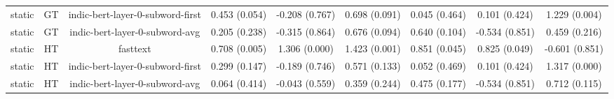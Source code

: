 \begin{sidewaystable}[htb]
\begin{tabular}{@{}ccccccccc@{}}
        static & GT & indic-bert-layer-0-subword-first & 0.453 (0.054) & -0.208 (0.767) & 0.698 (0.091) & 0.045 (0.464) & 0.101 (0.424) & 1.229 (0.004) \\
        static & GT & indic-bert-layer-0-subword-avg & 0.205 (0.238) & -0.315 (0.864) & 0.676 (0.094) & 0.640 (0.104) & -0.534 (0.851) & 0.459 (0.216) \\
        static & HT & fasttext & 0.708 (0.005) & 1.306 (0.000) & 1.423 (0.001) & 0.851 (0.045) & 0.825 (0.049) & -0.601 (0.851) \\
        static & HT & indic-bert-layer-0-subword-first & 0.299 (0.147) & -0.189 (0.746) & 0.571 (0.133) & 0.052 (0.469) & 0.101 (0.424) & 1.317 (0.000) \\
        static & HT & indic-bert-layer-0-subword-avg & 0.064 (0.414) & -0.043 (0.559) & 0.359 (0.244) & 0.475 (0.177) & -0.534 (0.851) & 0.712 (0.115) \\
        \bottomrule
    \end{tabular}
\end{sidewaystable}